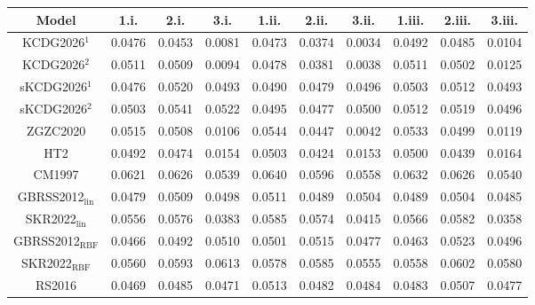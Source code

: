 
\begin{tabular}{cccccccccc}
\hline
Model & 1.i. & 2.i. & 3.i. & 1.ii. & 2.ii. & 3.ii. & 1.iii. & 2.iii. & 3.iii.\\
\hline
KCDG2026$^1$ & 0.0476 & 0.0453 & 0.0081 & 0.0473 & 0.0374 & 0.0034 & 0.0492 & 0.0485 & 0.0104\\
KCDG2026$^2$ & 0.0511 & 0.0509 & 0.0094 & 0.0478 & 0.0381 & 0.0038 & 0.0511 & 0.0502 & 0.0125\\
sKCDG2026$^1$ & 0.0476 & 0.0520 & 0.0493 & 0.0490 & 0.0479 & 0.0496 & 0.0503 & 0.0512 & 0.0493\\
sKCDG2026$^2$ & 0.0503 & 0.0541 & 0.0522 & 0.0495 & 0.0477 & 0.0500 & 0.0512 & 0.0519 & 0.0496\\
ZGZC2020 & 0.0515 & 0.0508 & 0.0106 & 0.0544 & 0.0447 & 0.0042 & 0.0533 & 0.0499 & 0.0119\\

HT2 & 0.0492 & 0.0474 & 0.0154 & 0.0503 & 0.0424 & 0.0153 & 0.0500 & 0.0439 & 0.0164\\
CM1997 & 0.0621 & 0.0626 & 0.0539 & 0.0640 & 0.0596 & 0.0558 & 0.0632 & 0.0626 & 0.0540\\
GBRSS2012$_{\text{lin}}$ & 0.0479 & 0.0509 & 0.0498 & 0.0511 & 0.0489 & 0.0504 & 0.0489 & 0.0504 & 0.0485\\
SKR2022$_{\text{lin}}$ & 0.0556 & 0.0576 & 0.0383 & 0.0585 & 0.0574 & 0.0415 & 0.0566 & 0.0582 & 0.0358\\
GBRSS2012$_{\text{RBF}}$ & 0.0466 & 0.0492 & 0.0510 & 0.0501 & 0.0515 & 0.0477 & 0.0463 & 0.0523 & 0.0496\\

SKR2022$_{\text{RBF}}$ & 0.0560 & 0.0593 & 0.0613 & 0.0578 & 0.0585 & 0.0555 & 0.0558 & 0.0602 & 0.0580\\
RS2016 & 0.0469 & 0.0485 & 0.0471 & 0.0513 & 0.0482 & 0.0484 & 0.0483 & 0.0507 & 0.0477\\
\hline
\end{tabular}
